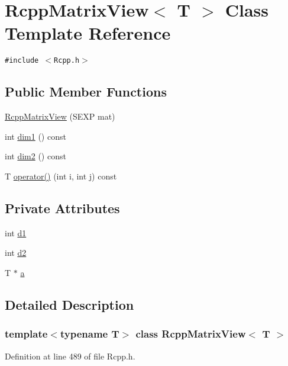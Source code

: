 \hypertarget{classRcppMatrixView}{
\section{RcppMatrixView$<$ T $>$ Class Template Reference}
\label{classRcppMatrixView}
}
{\tt \#include $<$Rcpp.h$>$}

\subsection*{Public Member Functions}
\begin{CompactItemize}
\item 
\hyperlink{classRcppMatrixView_c3489c6a24c2975f3ea7103ada50e328}{RcppMatrixView} (SEXP mat)
\item 
int \hyperlink{classRcppMatrixView_72d1d7fcdc4b1cc6dd877b1df2f9f5e6}{dim1} () const 
\item 
int \hyperlink{classRcppMatrixView_ebb7f65646ce780c897dc39f31899439}{dim2} () const 
\item 
T \hyperlink{classRcppMatrixView_d135a7e855eee55b078807766aff9e96}{operator()} (int i, int j) const 
\end{CompactItemize}
\subsection*{Private Attributes}
\begin{CompactItemize}
\item 
int \hyperlink{classRcppMatrixView_d492401691ef709f6d2ef7dc1dcc2134}{d1}
\item 
int \hyperlink{classRcppMatrixView_37b5f5806957eeb0b688d6a157a2a264}{d2}
\item 
T $\ast$ \hyperlink{classRcppMatrixView_d38481118f63a84a132e8f2265de5bdd}{a}
\end{CompactItemize}


\subsection{Detailed Description}
\subsubsection*{template$<$typename T$>$ class RcppMatrixView$<$ T $>$}



Definition at line 489 of file Rcpp.h.

